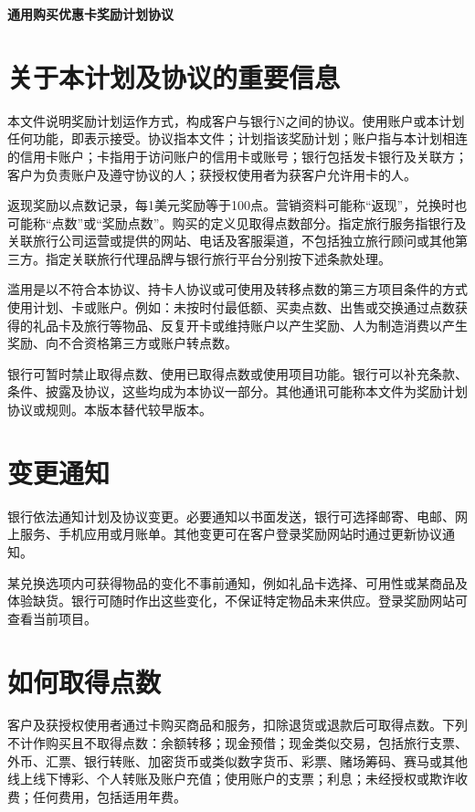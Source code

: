 \documentclass[UTF8,fontset=none,11pt,a4paper]{ctexart}
\begin{document}
{\noindent\fontsize{20}{25}\selectfont\bfseries 通用购买优惠卡奖励计划协议\par}
\vspace{10pt}
\section*{关于本计划及协议的重要信息}
本文件说明奖励计划运作方式，构成客户与银行N之间的协议。使用账户或本计划任何功能，即表示接受。协议指本文件；计划指该奖励计划；账户指与本计划相连的信用卡账户；卡指用于访问账户的信用卡或账号；银行包括发卡银行及关联方；客户为负责账户及遵守协议的人；获授权使用者为获客户允许\allowbreak\mbox{用卡的人。}


返现奖励以点数记录，每1美元奖励等于100点。营销资料可能称“返现”，兑换时也可能称“点数”或“奖励点数”。购买的定义见取得点数部分。指定旅行服务指银行及关联旅行公司运营或提供的网站、电话及客服渠道，不包括独立旅行顾问或其他第三方。指定关联旅行代理品牌与银行旅行平台分别按下述\allowbreak\mbox{条款处理。}


滥用是以不符合本协议、持卡人协议或可使用及转移点数的第三方项目条件的方式使用计划、卡或账户。例如：未按时付最低额、买卖点数、出售或交换通过点数获得的礼品卡及旅行等物品、反复开卡或维持账户以产生奖励、人为制造消费以产生奖励、向不合资格第三方或账\allowbreak\mbox{户转点数。}


银行可暂时禁止取得点数、使用已取得点数或使用项目功能。银行可以补充条款、条件、披露及协议，这些均成为本协议一部分。其他通讯可能称本文件为奖励计划协议或规则。本版本替代\allowbreak\mbox{较早版本。}


\section*{变更通知}
银行依法通知计划及协议变更。必要通知以书面发送，银行可选择邮寄、电邮、网上服务、手机应用或月账单。其他变更可在客户登录奖励网站时通过更新\allowbreak\mbox{协议通知。}


某兑换选项内可获得物品的变化不事前通知，例如礼品卡选择、可用性或某商品及体验缺货。银行可随时作出这些变化，不保证特定物品未来供应。登录奖励网站可查看\allowbreak\mbox{当前项目。}


\section*{如何取得点数}
客户及获授权使用者通过卡购买商品和服务，扣除退货或退款后可取得点数。下列不计作购买且不取得点数：余额转移；现金预借；现金类似交易，包括旅行支票、外币、汇票、银行转账、加密货币或类似数字货币、彩票、赌场筹码、赛马或其他线上线下博彩、个人转账及账户充值；使用账户的支票；利息；未经授权或欺诈收费；任何费用，包括\allowbreak\mbox{适用年费。}
\end{document}
